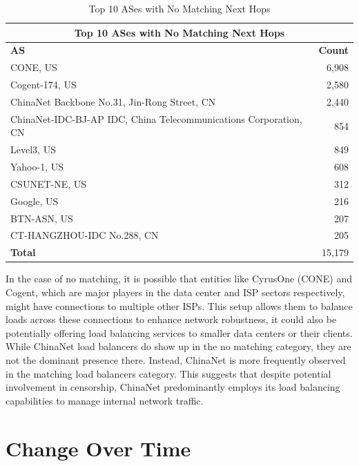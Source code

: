 \documentclass[12pt]{cwru_thesis}
\begin{document}
\begin{table}[h!]
    \centering
    \begin{tabular}{|l|r|}
        \hline
        \multicolumn{2}{|c|}{\textbf{Top 10 ASes with No Matching Next Hops}} \\
        \hline
        \textbf{AS} & \textbf{Count} \\
        \hline
        CONE, US & 6,908 \\
        Cogent-174, US & 2,580 \\
        ChinaNet Backbone No.31, Jin-Rong Street, CN & 2,440 \\
        ChinaNet-IDC-BJ-AP IDC, China Telecommunications Corporation, CN & 854 \\
        Level3, US & 849 \\
        Yahoo-1, US & 608 \\
        CSUNET-NE, US & 312 \\
        Google, US & 216 \\
        BTN-ASN, US & 207 \\
        CT-HANGZHOU-IDC No.288, CN & 205 \\
        \hline
        \textbf{Total} & 15,179 \\
        \hline
    \end{tabular}
    \caption{Top 10 ASes with No Matching Next Hops}
    \label{tab:no_matching}
\end{table}


In the case of no matching, it is possible that entities like CyrusOne (CONE) and Cogent, which are major players in the data center and ISP sectors respectively, might have connections to multiple other ISPs. This setup allows them to balance loads across these connections to enhance network robustness, it could also be potentially offering load balancing services to smaller data centers or their clients.
While ChinaNet load balancers do show up in the no matching category, they are not the dominant presence there. Instead, ChinaNet is more frequently observed in the matching load balancers category. This suggests that despite potential involvement in censorship, ChinaNet predominantly employs its load balancing capabilities to manage internal network traffic.



\section{Change Over Time}
\end{document}
